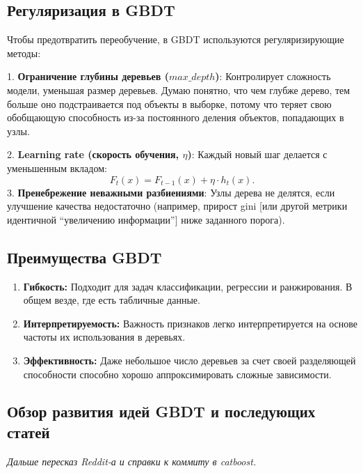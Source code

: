 \subsection*{Регуляризация в GBDT}

Чтобы предотвратить переобучение, в GBDT используются регуляризирующие методы:

1. \textbf{Ограничение глубины деревьев (\(max\_depth\))}:  
   Контролирует сложность модели, уменьшая размер деревьев. Думаю понятно, что чем глубже дерево, тем больше оно подстраивается под объекты в выборке, потому что теряет свою обобщающую способность из-за постоянного деления объектов, попадающих в узлы.

2. \textbf{Learning rate (скорость обучения, \(\eta\))}:  
   Каждый новый шаг делается с уменьшенным вкладом:
   \[
   F_t(x) = F_{t-1}(x) + \eta \cdot h_t(x).
   \]
3. \textbf{Пренебрежение неважными разбиениями}:  
   Узлы дерева не делятся, если улучшение качества недостаточно (например, прирост gini [или другой метрики идентичной ``увеличению информации''] ниже заданного порога).


\subsection*{Преимущества GBDT}

\begin{enumerate}
    \item \textbf{Гибкость:}  
    Подходит для задач классификации, регрессии и ранжирования. В общем везде, где есть табличные данные.

    \item \textbf{Интерпретируемость:}  
    Важность признаков легко интерпретируется на основе частоты их использования в деревьях.

    \item \textbf{Эффективность:}  
    Даже небольшое число деревьев за счет своей разделяющей способности способно хорошо аппроксимировать сложные зависимости.
\end{enumerate}


\subsection*{Обзор развития идей GBDT и последующих статей}  

\hspace{1.5em}\textit{Дальше пересказ Reddit-а и справки к коммиту в catboost.}
\vspace{1cm}

